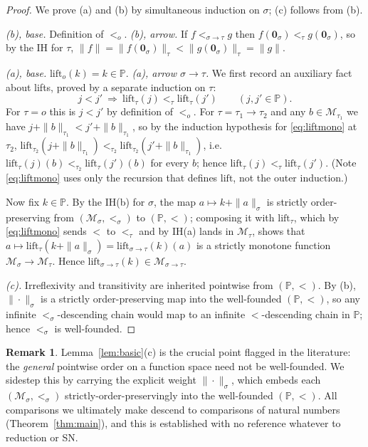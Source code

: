\documentclass{amsart}
\theoremstyle{definition}
\newtheorem{remark}{Remark}
\begin{document}
\begin{proof}
We prove (a) and (b) by simultaneous induction on $\sigma$; (c) follows from (b).

\emph{(b), base.} Definition of $<_o$.
\emph{(b), arrow.} If $f<_{\sigma\to\tau}g$ then $f(\mathbf 0_\sigma)<_\tau g(\mathbf 0_\sigma)$,
so by the IH for $\tau$, $\|f\|=\|f(\mathbf 0_\sigma)\|_\tau<\|g(\mathbf 0_\sigma)\|_\tau=\|g\|$.

\emph{(a), base.} $\mathrm{lift}_o(k)=k\in\mathbb P$.
\emph{(a), arrow $\sigma\to\tau$.} We first record an auxiliary fact about lifts,
proved by a separate induction on $\tau$:
\begin{equation}\tag{$\ast$}\label{eq:liftmono}
  j<j' \ \Longrightarrow\ \mathrm{lift}_\tau(j)<_\tau\mathrm{lift}_\tau(j')
  \qquad(j,j'\in\mathbb P).
\end{equation}
For $\tau=o$ this is $j<j'$ by definition of $<_o$. For $\tau=\tau_1\to\tau_2$ and any
$b\in\mathcal M_{\tau_1}$ we have $j+\|b\|_{\tau_1}<j'+\|b\|_{\tau_1}$, so by the
induction hypothesis for \eqref{eq:liftmono} at $\tau_2$,
$\mathrm{lift}_{\tau_2}(j+\|b\|_{\tau_1})<_{\tau_2}\mathrm{lift}_{\tau_2}(j'+\|b\|_{\tau_1})$,
i.e. $\mathrm{lift}_\tau(j)(b)<_{\tau_2}\mathrm{lift}_\tau(j')(b)$ for every $b$; hence
$\mathrm{lift}_\tau(j)<_\tau\mathrm{lift}_\tau(j')$. (Note \eqref{eq:liftmono} uses only
the recursion that defines $\mathrm{lift}$, not the outer induction.)

Now fix $k\in\mathbb P$. By the IH(b) for $\sigma$, the map $a\mapsto k+\|a\|_\sigma$ is
strictly order-preserving from $(\mathcal M_\sigma,<_\sigma)$ to $(\mathbb P,<)$;
composing it with $\mathrm{lift}_\tau$, which by \eqref{eq:liftmono} sends $<$ to
$<_\tau$ and by IH(a) lands in $\mathcal M_\tau$, shows that
$a\mapsto\mathrm{lift}_\tau(k+\|a\|_\sigma)=\mathrm{lift}_{\sigma\to\tau}(k)(a)$ is a
strictly monotone function $\mathcal M_\sigma\to\mathcal M_\tau$. Hence
$\mathrm{lift}_{\sigma\to\tau}(k)\in\mathcal M_{\sigma\to\tau}$.

\emph{(c).} Irreflexivity and transitivity are inherited pointwise from $(\mathbb P,<)$.
By (b), $\|\cdot\|_\sigma$ is a strictly order-preserving map into the well-founded
$(\mathbb P,<)$, so any infinite $<_\sigma$-descending chain would map to an infinite
$<$-descending chain in $\mathbb P$; hence $<_\sigma$ is well-founded.
\end{proof}

\begin{remark}
Lemma~\ref{lem:basic}(c) is the crucial point flagged in the literature: the
\emph{general} pointwise order on a function space need not be well-founded. We sidestep
this by carrying the explicit weight $\|\cdot\|_\sigma$, which embeds each
$(\mathcal M_\sigma,<_\sigma)$ strictly-order-preservingly into the well-founded
$(\mathbb P,<)$. All comparisons we ultimately make descend to comparisons of natural
numbers (Theorem~\ref{thm:main}), and this is established with no reference whatever to
reduction or SN.
\end{remark}
\end{document}
